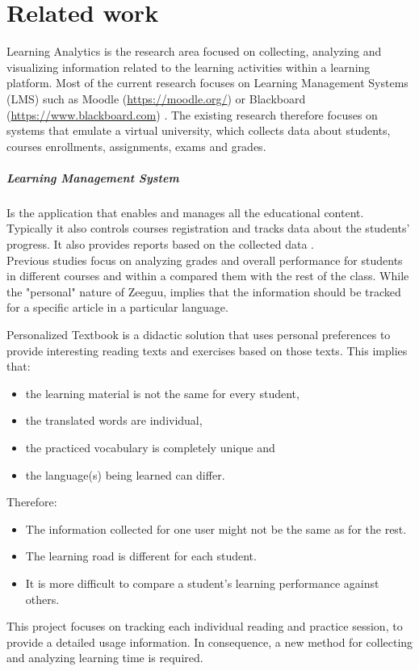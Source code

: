 \chapter{Related work}\label{ch:learning analytics}

Learning Analytics is the research area focused on collecting, analyzing and visualizing information \cite{Brown2011} related to the learning activities within a learning platform. Most of the current research focuses on Learning Management Systems (LMS) such as Moodle (\url{https://moodle.org/}) \cite{Park2015} \cite{Romero2008} or Blackboard (\url{https://www.blackboard.com}) \cite{Arnold2012}. The existing research therefore focuses on systems that emulate a virtual university, which collects data about students, courses enrollments, assignments, exams and grades.

\paragraph{Learning Management System}

Is the application that enables and manages all the educational content. Typically it also controls courses registration and tracks data about the students' progress. It also provides reports based on the collected data \cite{Watson2007}.\\

Previous studies focus on analyzing grades and overall performance for students in different courses and within a compared them with the rest of the class. While the "personal" nature of Zeeguu, implies that the information should be tracked for a specific article in a particular language. 

Personalized Textbook is a didactic solution that uses personal preferences to provide interesting reading texts and exercises based on those texts. This implies that:
\begin{itemize}
	\item the learning material is not the same for every student,
	\item the translated words are individual,
	\item the practiced vocabulary is completely unique and
	\item the language(s) being learned can differ.
\end{itemize}

Therefore:
\begin{itemize}
	\item The information collected for one user might not be the same as for the rest.
	\item The learning road is different for each student.
	\item It is more difficult to compare a student's learning performance against others. 
\end{itemize}

This project focuses on tracking each individual reading and practice session, to provide a detailed usage information. In consequence, a new method for collecting and analyzing learning time is required.


